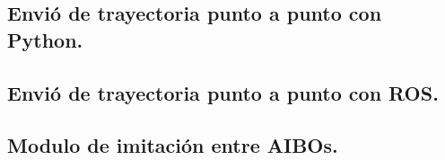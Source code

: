 \documentclass[12pt,a4paper,final,twoside]{book}
\begin{document}
\subsection{Envió de trayectoria punto a punto con Python.}\label{sinP}


\subsection{Envió de trayectoria punto a punto con ROS.}\label{sinlegROS}


\subsection{Modulo de imitación entre AIBOs.}\label{mimiccode}

\end{document}
